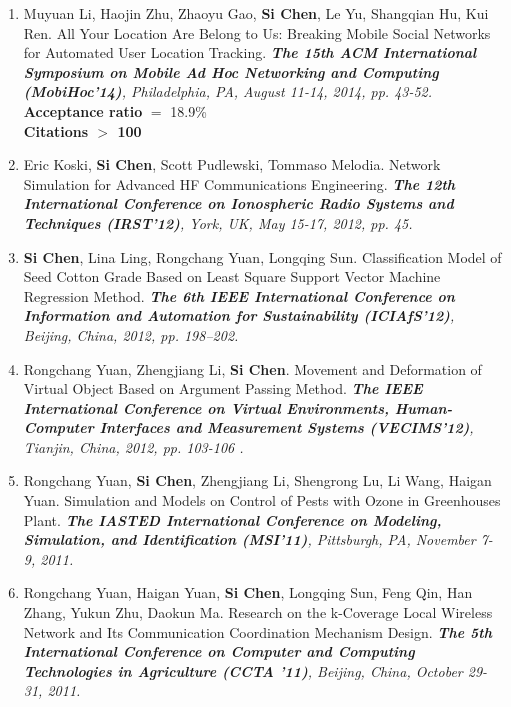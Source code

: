 \documentclass[letter]{article}
\newcommand{\publication}[4]{\item #1. #2. \emph{#3.} #4}
\begin{document}
\begin{description}
\begin{enumerate}[{C-}1.]
\publication{Muyuan Li, Haojin Zhu, Zhaoyu Gao, \textbf{Si Chen}, Le Yu, Shangqian Hu, Kui Ren} {All Your Location Are Belong to Us: Breaking Mobile Social Networks for Automated User Location Tracking}  {\textbf{The 15th ACM International Symposium on Mobile Ad Hoc Networking and Computing (MobiHoc'14)}, Philadelphia, PA, August 11-14, 2014, pp. 43-52} \\
\textbf{Acceptance ratio} $=$ 18.9\% \\
\textbf{Citations $>$ 100} \\

\publication{Eric Koski, \textbf{Si Chen}, Scott Pudlewski, Tommaso Melodia} {Network Simulation for Advanced HF Communications Engineering}  {\textbf{The 12th International Conference on Ionospheric Radio Systems and Techniques (IRST'12)}, York, UK, May 15-17, 2012, pp. 45}\\

\publication{\textbf{Si Chen}, Lina Ling, Rongchang Yuan, Longqing Sun} {Classification Model of Seed Cotton Grade Based on Least Square Support Vector Machine Regression Method}  {\textbf{The 6th IEEE International Conference on Information and Automation for Sustainability (ICIAfS'12)}, Beijing, China, 2012, pp. 198--202} \\

\publication{Rongchang Yuan, Zhengjiang Li, \textbf{Si Chen}} {Movement and Deformation of Virtual Object Based on Argument Passing Method}  {\textbf{The IEEE International Conference on Virtual Environments, Human-Computer Interfaces and Measurement Systems (VECIMS'12)}, Tianjin, China, 2012, pp. 103-106 } \\

\publication{Rongchang Yuan, \textbf{Si Chen}, Zhengjiang Li, Shengrong Lu, Li Wang, Haigan Yuan} {Simulation and Models on Control of Pests with Ozone in Greenhouses Plant}  {\textbf{The IASTED International Conference on Modeling, Simulation, and Identification (MSI'11)}, Pittsburgh, PA, November 7-9, 2011} \\

\publication{Rongchang Yuan, Haigan Yuan, \textbf{Si Chen}, Longqing Sun, Feng Qin, Han Zhang, Yukun Zhu, Daokun Ma} {Research on the k-Coverage Local Wireless Network and Its Communication Coordination Mechanism Design}  {\textbf{The 5th International Conference on Computer and Computing Technologies in Agriculture (CCTA '11)}, Beijing, China, October 29-31, 2011} \\

\end{enumerate}


\end{description}
\end{document}
